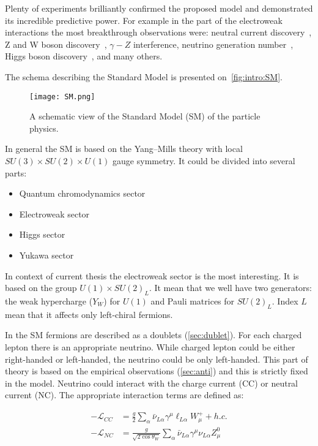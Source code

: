 \documentclass[../main.tex]{subfiles}
\begin{document}
Plenty of experiments brilliantly confirmed the proposed model and demonstrated its incredible predictive power. For example in the part of the electroweak interactions the most breakthrough observations were: neutral current discovery~\cite{Cundy1974}, Z and W boson discovery~\cite{Arnison1983}, $\gamma-Z$ interference, neutrino generation number~\cite{Arnison1983}, Higgs boson discovery~\cite{Aad2012}, and many others.

The schema describing the Standard Model is presented on~\autoref{fig:intro:SM}.

\begin{figure}[!ht]
    \centering
    \texttt{[image: SM.png]}
    \caption{A schematic view of the Standard Model (SM) of the particle physics.}
    \label{fig:intro:SM}
\end{figure}

In general the SM is based on the Yang–Mills theory with local $SU(3)\times SU(2)\times U(1)$ gauge symmetry. It could be divided into several parts:
\begin{itemize}
  \item Quantum chromodynamics sector
  \item Electroweak sector
  \item Higgs sector
  \item Yukawa sector
\end{itemize}

In context of current thesis the electroweak sector is the most interesting. It is based on the group $U(1)\times SU(2)_L$. It mean that we well have two generators: the weak hypercharge ($Y_W$) for $U(1)$ and Pauli matrices for $SU(2)_L$. Index $L$ mean that it affects only left-chiral fermions.

In the SM fermions are described as a doublets (\autoref{sec:dublet}). For each charged lepton there is an appropriate neutrino. While charged lepton could be either right-handed or left-handed, the neutrino could be only left-handed. This part of theory is based on the empirical observations (\autoref{sec:anti}) and this is strictly fixed in the model. Neutrino could interact with the charge current (CC) or neutral current (NC). The appropriate interaction terms are defined as:

\begin{align}
-\mathcal{L}_{CC}&=\frac{g}{2}\sum_\alpha\bar{\nu}_{L\alpha}\gamma^\mu\ell_{L\alpha}W^+_\mu+h.c. \\ \nonumber
-\mathcal{L}_{NC}&=\frac{g}{\sqrt{2\cos{\theta_W}}}\sum_\alpha\bar{\nu}_{L\alpha}\gamma^\mu\nu_{L\alpha}Z^0_\mu
\end{align}
\end{document}
